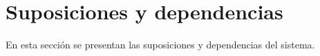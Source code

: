 \section{Suposiciones y dependencias}

En esta sección se presentan las suposiciones y dependencias del sistema.